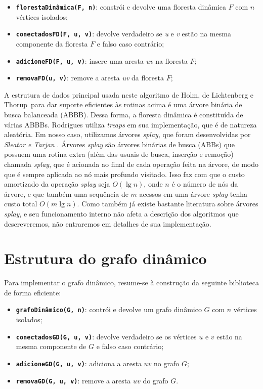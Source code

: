 \begin{itemize}
    \item \texttt{\textbf{florestaDinâmica(F, n)}}: constrói e devolve uma floresta dinâmica $F$ com $n$ vértices isolados;
    \item \texttt{\textbf{conectadosFD(F, u, v)}}: devolve verdadeiro se \textit{u} e \textit{v} estão na mesma componente da floresta $F$ e falso caso contrário;
    \item \texttt{\textbf{adicioneFD(F, u, v)}}: insere uma aresta \textit{uv} na floresta $F$;
    \item \texttt{\textbf{removaFD(u, v)}}: remove a aresta \textit{uv} da floresta $F$;
\end{itemize}

A estrutura de dados principal usada neste algoritmo de Holm, de Lichtenberg e Thorup~para dar suporte eficientes às rotinas acima é uma árvore binária de busca balanceada (ABBB). Dessa forma, a floresta dinâmica é constituída de várias ABBBs. Rodrigues utiliza \textit{treaps} em sua implementação, que é de natureza aleatória. Em nosso caso, utilizamos árvores \textit{splay}, que foram desenvolvidas por \textit{Sleator e Tarjan} \cite{sleator}. Árvores \textit{splay} são árvores binárias de busca (ABBs) que possuem uma rotina extra (além das usuais de busca, inserção e remoção) chamada \textit{splay}, que é acionada ao final de cada operação feita na árvore, de modo que é sempre aplicada ao nó mais profundo visitado. Isso faz com que o custo amortizado da operação \textit{splay} seja $O(\lg n)$, onde $n$ é o número de nós da árvore, e que também uma sequência de $m$ acessos em uma árvore \textit{splay} tenha custo total $O(m \lg n)$.  Como também já existe bastante literatura sobre árvores \textit{splay}, e seu funcionamento interno não afeta a descrição dos algoritmos que descreveremos, não entraremos em detalhes de sua implementação.

\section{Estrutura do grafo dinâmico}

Para implementar o grafo dinâmico, resume-se à construção da seguinte biblioteca de forma eficiente:

\begin{itemize}
    \item \texttt{\textbf{grafoDinâmico(G, n)}}: contrói e devolve um grafo dinâmico $G$ com $n$ vértices isolados;
    \item \texttt{\textbf{conectadosGD(G, u, v)}}: devolve verdadeiro se os vértices $u$ e $v$ estão na mesma componente de $G$ e falso caso contrário;
    \item \texttt{\textbf{adicioneGD(G, u, v)}}: adiciona a aresta $uv$ no grafo $G$;
    \item \texttt{\textbf{removaGD(G, u, v)}}: remove a aresta $uv$ do grafo $G$.
\end{itemize} 

